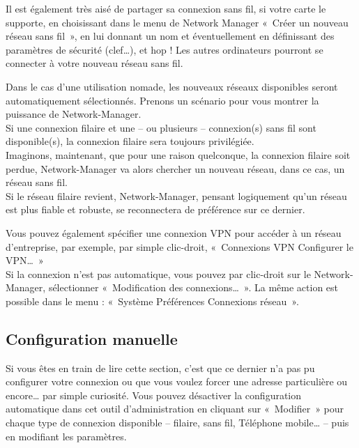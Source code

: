 Il est également très aisé de partager sa connexion sans fil, si votre carte  le supporte, en choisissant dans le menu de Network Manager «~Créer un nouveau réseau sans fil~», en lui donnant un nom et éventuellement en définissant des paramètres de sécurité (clef\ldots{}), et hop ! Les autres ordinateurs pourront se connecter à votre nouveau réseau sans fil.
\begin{nota}
Dans le cas d'une utilisation nomade, les nouveaux réseaux disponibles seront automatiquement sélectionnés. Prenons un scénario pour vous montrer la puissance de Network-Manager.\\
Si une connexion filaire et une -- ou plusieurs -- connexion(s) sans fil sont disponible(s), la connexion filaire sera toujours privilégiée.\\
Imaginons, maintenant, que pour une raison quelconque, la connexion filaire soit perdue, Network-Manager va alors chercher un nouveau réseau, dans ce cas, un réseau sans fil.\\
Si le réseau filaire revient, Network-Manager, pensant logiquement qu'un réseau  est plus fiable et robuste, se reconnectera de préférence sur ce dernier.\par
\GestionReseauNM
\end{nota}
Vous pouvez également spécifier une connexion VPN pour accéder à un réseau d'entreprise, par exemple, par simple clic-droit, «~Connexions VPN \FlecheDroite Configurer le VPN\ldots{}~»\\
Si la connexion n'est pas automatique, vous pouvez par clic-droit sur le Network-Manager, sélectionner «~Modification des connexions\ldots{}~». La même action est possible dans le menu : «~Système \FlecheDroite Préférences \FlecheDroite Connexions réseau~».
\subsection{Configuration manuelle}
\label{ConfigReseauManuelle}
Si vous êtes en train de lire cette section, c'est que ce dernier n'a pas pu configurer votre connexion  ou que vous voulez forcer une adresse  particulière ou encore\dots{} par simple curiosité. Vous pouvez désactiver la configuration automatique dans cet outil d'administration en cliquant sur «~Modifier~» pour chaque type de connexion disponible -- filaire, sans fil, Téléphone mobile\ldots{} -- puis en modifiant les paramètres.
